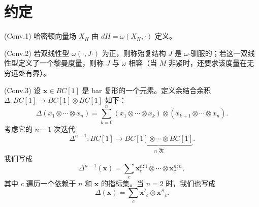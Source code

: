 
\section{约定}
\label{sec:1-7}

\par\smallskip\noindent\textup{(Conv.1)}\quad
哈密顿向量场 $X_H$ 由
$dH=\omega(X_H,\mathord\cdot)$ 定义。

\par\smallskip\noindent\textup{(Conv.2)}\quad
若双线性型 $\omega(\mathord\cdot,J\mathord\cdot)$ 为正，则称殆复结构 $J$
是 $\omega$-驯服的；若这一双线性型定义了一个黎曼度量，则称 $J$ 与
$\omega$ 相容（当 $M$ 非紧时，还要求该度量在无穷远处有界）。

\par\smallskip\noindent\textup{(Conv.3)}\quad
设 $\mathbf{x}\in BC[1]$ 是 bar 复形的一个元素。定义余结合余积
$\Delta\colon BC[1]\to BC[1]\otimes BC[1]$ 如下：
\begin{equation}
  \Delta(x_1\otimes\cdots\otimes x_n)
  =\sum_{k=0}^{n}
  (x_1\otimes\cdots\otimes x_k)
  \otimes
  (x_{k+1}\otimes\cdots\otimes x_n).
  \tag{1.34}\label{eq:1-34}
\end{equation}
考虑它的 $n-1$ 次迭代
\[
  \Delta^{n-1}\colon BC[1]\longrightarrow
  \underbrace{BC[1]\otimes\cdots\otimes BC[1]}_{n\text{ 次}}.
\]
我们写成
\begin{equation}
  \Delta^{n-1}(\mathbf{x})
  =\sum_c
  \mathbf{x}^{n:1}_c\otimes\cdots\otimes\mathbf{x}^{n:n}_c,
  \tag{1.35}\label{eq:1-35}
\end{equation}
其中 $c$ 遍历一个依赖于 $n$ 和 $\mathbf{x}$ 的指标集。当 $n=2$ 时，我们也写成
\begin{equation}
  \Delta(\mathbf{x})=\sum_c\mathbf{x}'_c\otimes\mathbf{x}''_c.
  \tag{1.36}\label{eq:1-36}
\end{equation}

